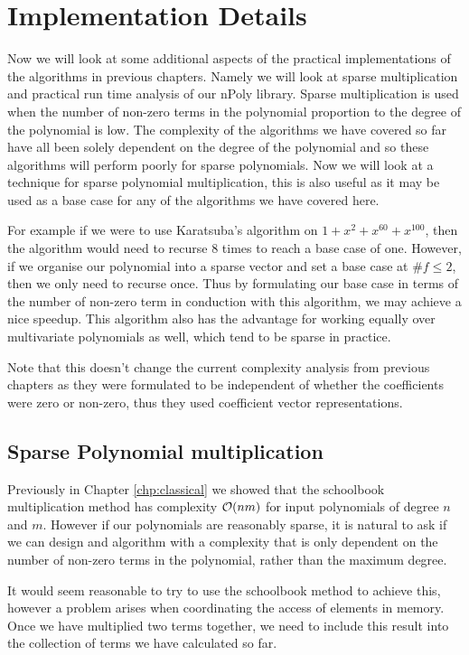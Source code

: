 \chapter{Implementation Details}\label{chp:implementation}

Now we will look at some additional aspects of the practical implementations of the algorithms in previous chapters. Namely we will look at sparse multiplication and practical run time analysis of our nPoly library\cite{npoly}. Sparse multiplication is used when the number of non-zero terms in the polynomial proportion to the degree of the polynomial is low. The complexity of the algorithms we have covered so far have all been solely dependent on the degree of the polynomial and so these algorithms will perform poorly for sparse polynomials. Now we will look at a technique for sparse polynomial multiplication, this is also useful as it may be used as a base case for any of the algorithms we have covered here.

For example if we were to use Karatsuba's algorithm on $1 + x^2 + x^{60} + x^{100}$, then the algorithm would need to recurse $8$ times to reach a base case of one. However, if we organise our polynomial into a sparse vector and set a base case at $\# f \le 2$, then we only need to recurse once. Thus by formulating our base case in terms of the number of non-zero term in conduction with this algorithm, we may achieve a nice speedup. This algorithm also has the advantage for working equally over multivariate polynomials as well, which tend to be sparse in practice.

Note that this doesn't change the current complexity analysis from previous chapters as they were formulated to be independent of whether the coefficients were zero or non-zero, thus they used coefficient vector representations.

\section{Sparse Polynomial multiplication}

Previously in Chapter \ref{chp:classical} we showed that the schoolbook multiplication method has complexity $\mathcal O(nm)$ for input polynomials of degree $n$ and $m$. However if our polynomials are reasonably sparse, it is natural to ask if we can design and algorithm with a complexity that is only dependent on the number of non-zero terms in the polynomial, rather than the maximum degree.

It would seem reasonable to try to use the schoolbook method to achieve this, however a problem arises when coordinating the access of elements in memory. Once we have multiplied two terms together, we need to include this result into the collection of terms we have calculated so far.

